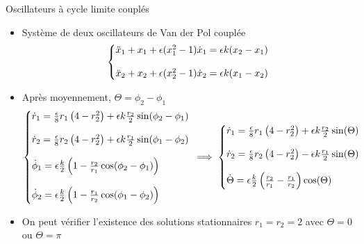 \begin{frame}{Oscillateurs à cycle limite couplés}
  \begin{itemize}
    \item Système de deux oscillateurs de Van der Pol couplée
    \begin{equation*}
      \left\{\begin{array}{@{}l@{}}
      \ddot{x}_1 + x_1  + \epsilon(x_1^2 - 1)\dot{x}_1 = \epsilon k(x_2 - x_1) \\
      \\
      \ddot{x}_2 + x_2 + \epsilon(x_2^2 - 1)\dot{x}_2 = \epsilon k(x_1 - x_2)
    \end{array}\right.\, 
    \end{equation*}
    \item Après moyennement, $\Theta = \phi_2 - \phi_1$
    \tiny
    \begin{equation*}
      \left\{\begin{array}{@{}l@{}}
        \dot{r}_1 =  \frac{\epsilon}{8} r_1 \left( 4 - r_2^2 \right) + \epsilon k\frac{r_2}{2}\sin(\phi_2 - \phi_1)\\
        \\
        \dot{r}_2 =  \frac{\epsilon}{8} r_2 \left( 4 - r_2^2 \right) + \epsilon k\frac{r_1}{2}\sin(\phi_1 - \phi_2)\\
        \\
        \dot{\phi}_1 = \epsilon \frac{k}{2}\left( 1 - \frac{r_2}{r_1}\cos(\phi_2 - \phi_1)\right) \\
        \\
        \dot{\phi}_2 = \epsilon \frac{k}{2}\left( 1 - \frac{r_1}{r_2}\cos(\phi_1 - \phi_2)\right)
    \end{array}\right.\,
    \implies
      \left\{\begin{array}{@{}l@{}}
        \dot{r}_1 = \frac{\epsilon}{8} r_1 \left( 4 - r_2^2 \right) + \epsilon k\frac{r_2}{2}\sin(\Theta)\\
        \\
        \dot{r}_2 = \frac{\epsilon}{8} r_2 \left( 4 - r_2^2 \right) - \epsilon k\frac{r_1}{2}\sin(\Theta) \\
        \\
      \dot{\Theta} = \epsilon \frac{k}{2}\left(  \frac{r_2}{r_1} - \frac{r_1}{r_2} \right)\cos(\Theta)
    \end{array}\right.\,
    \end{equation*}
    \small
    \item On peut vérifier l'existence des solutions stationnaires $r_1=r_2=2$ avec $\Theta=0$ ou $\Theta=\pi$
  \end{itemize}
\end{frame}

